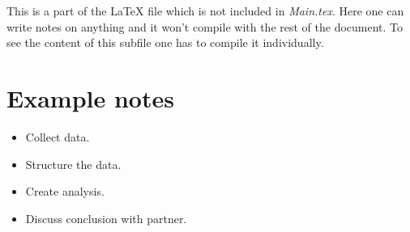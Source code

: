 \documentclass[../Main.tex]{subfiles}
\begin{document}
This is a part of the \LaTeX{} file which is not included in \textit{Main.tex}. Here one can write notes on anything and it won't compile with the rest of the document. To see the content of this subfile one has to compile it individually.

\section{Example notes}
\begin{itemize}
    \item Collect data.
    \item Structure the data.
    \item Create analysis.
    \item Discuss conclusion with partner.
\end{itemize}

\biblio %
\end{document}
